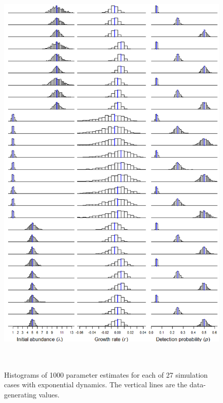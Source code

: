 \documentclass[12pt]{article}
\begin{document}




\begin{figure}
  \centering
  \includegraphics[height=8in]{figs/exp_hists}
\caption{Histograms of 1000 parameter estimates for each of 27
simulation cases with exponential dynamics. The vertical lines are the 
data-generating values.}
\label{fig:exp_hists}
\end{figure}
\end{document}
